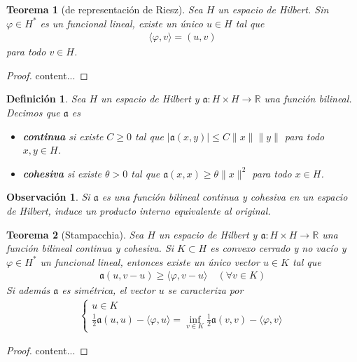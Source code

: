 \documentclass[11pt]{report}
\theoremstyle{colored}
\newtheorem{definition}{Definición}[section]
\newtheorem{theorem}{Teorema}[section]
\newtheorem{remark}{Observación}[section]
\newcommand{\R}{\mathbb{R}}
\newcommand{\ip}[1]{( #1 )}
\newcommand{\paint}[1]{\color{color}{#1}}
\begin{document}
\begin{theorem}[de representación de Riesz] Sea $H$ un espacio de Hilbert. Sin $\varphi \in H^*$ es un funcional lineal, existe un único $u \in H$ tal que
\begin{align*}
\langle \varphi, v\rangle  = \ip{u,v}
\end{align*}
para todo $v \in H$.
\end{theorem}
\begin{proof}
content...
\end{proof}

\begin{definition} Sea $H$ un espacio de Hilbert y $\mathfrak{a} : H \times H \to \R$ una función bilineal. Decimos que $\mathfrak{a}$ es
\begin{itemize}
\item[$\paint{\bullet}$] \textbf{continua} si existe $C \geq 0$ tal que $|\mathfrak{a}(x,y)| \leq C \|x\|\|y\|$ para todo $x,y \in H$. 
\item[$\paint{\bullet}$] \textbf{cohesiva} si existe $\theta > 0$ tal que $\mathfrak{a}(x,x) \geq \theta \|x\|^2$ para todo $x  \in H$.
\end{itemize}
\end{definition}
\begin{remark} Si $\mathfrak{a}$ es una función bilineal continua y cohesiva en un espacio de Hilbert, induce un producto interno equivalente al original.
\end{remark}

\begin{theorem}[Stampacchia] Sea $H$ un espacio de Hilbert y $\mathfrak{a} : H \times H \to \R$ una función bilineal continua y cohesiva. Si $K \subset H$ es convexo cerrado y no vacío y $\varphi \in H^*$ un funcional lineal, entonces existe un único vector $u \in K$ tal que
\begin{align*}
\mathfrak{a}(u,v-u) \geq \langle \varphi, v-u \rangle \quad (\forall v \in K)
\end{align*}
Si además $\mathfrak{a}$ es simétrica, el vector $u$ se caracteriza por
\begin{align*}
\begin{cases}
u \in K\\
\frac{1}{2}\mathfrak{a}(u,u) - \langle \varphi, u \rangle = \inf_{v \in K}\frac{1}{2}\mathfrak{a}(v,v) - \langle \varphi, v \rangle
\end{cases}
\end{align*}
\end{theorem}
\begin{proof}
content...
\end{proof}
\end{document}
